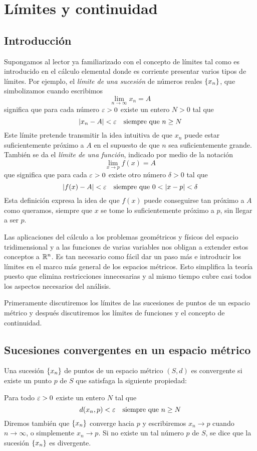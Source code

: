\chapter{Límites y continuidad}

\section{Introducción}

Supongamos al lector ya familiarizado con el concepto de límites tal como es introducido en el cálculo elemental donde es corriente presentar varios tipos de límites. Por ejemplo, el {\it límite de una sucesión} de números reales $\left\lbrace x_n\right\rbrace$, que simbolizamos cuando escribimos
$$\lim_{n\to\infty}x_n=A$$
significa que para cada número $\varepsilon>0$ existe un entero $N>0$ tal que
$$\left| x_n-A\right|<\varepsilon\quad\text{siempre que }n\geq N$$
Este límite pretende transmitir la idea intuitiva de que $x_n$ puede estar suficientemente próximo a $A$ en el supuesto de que $n$ sea suficientemente grande. También se da el {\it límite de una función}, indicado por medio de la notación
$$\lim_{x\to p}f(x)=A$$
que significa que para cada $\varepsilon>0$ existe otro número $\delta>0$ tal que
$$\left| f(x)-A\right|<\varepsilon \quad\text{siempre que }0<\left| x-p\right|<\delta$$
Esta definición expresa la idea de que $f(x)$ puede conseguirse tan próximo a $A$ como queramos, siempre que $x$ se tome lo suficientemente próximo a $p$, sin llegar a ser $p$.

Las aplicaciones del cálculo a los problemas geométricos y físicos del espacio tridimensional y a las funciones de varias variables nos obligan a extender estos conceptos a $\mathbb{R}^n$. Es tan necesario como fácil dar un paso más e introducir los límites en el marco más general de los espacios métricos. Esto simplifica la teoría puesto que elimina restricciones innecesarias y al mismo tiempo cubre casi todos los aspectos necesarios del análisis.

Primeramente discutiremos los límites de las sucesiones de puntos de un espacio métrico y después discutiremos los límites de funciones y el concepto de continuidad.

\section{Sucesiones convergentes en un espacio métrico}

\begin{definition}
    Una sucesión $\left\lbrace x_n\right\rbrace$ de puntos de un espacio métrico $(S, d)$ es convergente si existe un punto $p$ de $S$ que satisfaga la siguiente propiedad:

    Para todo $\varepsilon>0$ existe un entero $N$ tal que
    $$d(x_n,p)<\varepsilon\quad\text{siempre que }n\geq N$$
    Diremos también que $\left\lbrace x_n\right\rbrace$ converge hacia $p$ y escribiremos $x_n\to p$ cuando $n\to\infty$, o simplemente $x_n\to p$. Si no existe un tal número $p$ de $S$, se dice que la sucesión $\left\lbrace x_n\right\rbrace$ es divergente.
\end{definition}

